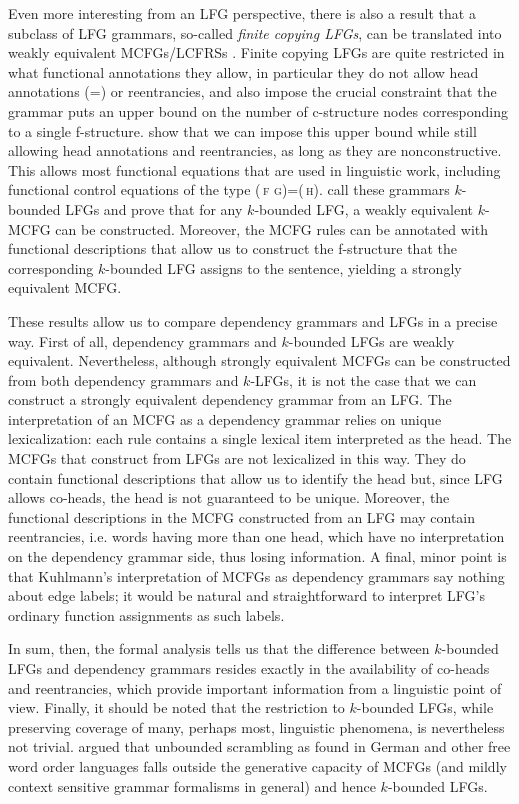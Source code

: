 \documentclass[output=paper,hidelinks]{langscibook}
\begin{document}
Even more interesting from an LFG perspective, there is also a result
that a subclass of LFG grammars, so-called \emph{finite copying LFGs},
can be translated into weakly equivalent MCFGs/LCFRSs
\citep{SekiEtAl1993}. Finite copying LFGs are quite restricted in what
functional annotations they allow, in particular they do not allow
head annotations (\ua=\da) or reentrancies, and also impose the
crucial constraint that the grammar puts an upper bound on the number
of c-structure nodes corresponding to a single
f-structure. \citet{wed:kap:20} show that we can impose this upper
bound while still allowing head annotations and reentrancies, as long
as they are nonconstructive. This allows most functional equations
that are used in linguistic work, including functional control
equations of the type (\ua\,\textsc{f
  g})=(\ua\,\textsc{h}). \citet{wed:kap:20} call these grammars
$k$-bounded LFGs and prove that for any $k$-bounded LFG, a weakly
equivalent $k$-MCFG can be constructed. Moreover, the MCFG rules can
be annotated with functional descriptions that allow us to construct
the f-structure that the corresponding $k$-bounded LFG assigns to the
sentence, yielding a strongly equivalent MCFG.

These results allow us to compare dependency grammars and LFGs in a
precise way. First of all, dependency grammars and $k$-bounded LFGs
are weakly equivalent. Nevertheless, although strongly equivalent
MCFGs can be constructed from both dependency grammars and $k$-LFGs,
it is not the case that we can construct a strongly equivalent
dependency grammar from an LFG. The interpretation of an MCFG as a
dependency grammar relies on unique lexicalization: each rule contains
a single lexical item interpreted as the head. The MCFGs that
\citet{wed:kap:20} construct from LFGs are not lexicalized in this
way. They do contain functional descriptions that allow us to identify
the head but, since LFG allows co-heads, the head is not guaranteed to
be unique. Moreover, the functional descriptions in the MCFG
constructed from an LFG may contain reentrancies, i.e. words having
more than one head, which have no interpretation on the dependency
grammar side, thus losing information. A final, minor point is that
Kuhlmann's interpretation of MCFGs as dependency grammars say nothing
about edge labels; it would be natural and straightforward to
interpret LFG's ordinary function assignments as such labels.

\hspace*{-.1pt}In sum, then, the formal analysis tells us that the difference between
$k$-bounded LFGs and dependency grammars resides exactly in the
availability of co-heads and reentrancies, which provide important
information from a linguistic point of view. Finally, it should be
noted that the restriction to $k$-bounded LFGs, while preserving
coverage of many, perhaps most, linguistic phenomena, is nevertheless
not trivial. \citet{Rambow2014} argued that unbounded scrambling as
found in German and other free word order languages falls outside the
generative capacity of MCFGs (and mildly context sensitive grammar
formalisms in general) and hence $k$-bounded LFGs.
\end{document}
